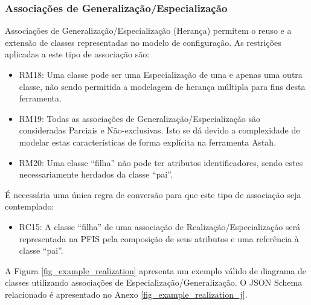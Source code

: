 
\subsubsection{Associações de Generalização/Especialização}

Associações de Generalização/Especialização (Herança) permitem o reuso e a extensão de classes representadas no modelo de configuração. As restrições aplicadas a este tipo de associação são:

\begin{itemize}
    \item RM18: Uma classe pode ser uma Especialização de uma e apenas uma outra classe, não sendo permitida a modelagem de herança múltipla para fins desta ferramenta.

    \item RM19: Todas as associações de Generalização/Especialização são consideradas Parciais e Não-exclusivas. Isto se dá devido a complexidade de modelar estas características de forma explícita na ferramenta Astah.

    \item RM20: Uma classe ``filha'' não pode ter atributos identificadores, sendo estes necessariamente herdados da classe ``pai''.
\end{itemize}

É necessária uma única regra de conversão para que este tipo de associação seja contemplado:

\begin{itemize}
    \item RC15: A classe ``filha'' de uma associação de Realização/Especialização será representada na PFIS pela composição de seus atributos e uma referência à classe ``pai''.
\end{itemize}

A Figura \ref{fig_example_realization} apresenta um exemplo válido de diagrama de classes utilizando associações de Especialização/Generalização. O JSON Schema relacionado é apresentado no Anexo \ref{fig_example_realization_j}.

